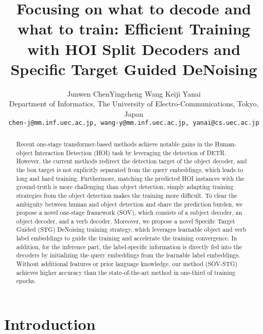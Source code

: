 \documentclass[10pt,twocolumn,letterpaper]{article}
\begin{document}
\title{Focusing on what to decode and what to train: Efficient Training with HOI Split Decoders and Specific Target Guided DeNoising}

\author{Junwen Chen\qquad Yingcheng Wang \qquad Keiji Yanai\\
Department of Informatics, The University of Electro-Communications, Tokyo, Japan\\
{\tt\small chen-j@mm.inf.uec.ac.jp, wang-y@mm.inf.uec.ac.jp, yanai@cs.uec.ac.jp}
}
\maketitle

\begin{abstract}
    Recent one-stage transformer-based methods achieve notable gains in the Human-object Interaction Detection (HOI) task by leveraging the detection of DETR.
    However, the current methods redirect the detection target of the object decoder, and the box target is not explicitly separated from the query embeddings, which leads to long and hard training.
    Furthermore, matching the predicted HOI instances with the ground-truth is more challenging than object detection, simply adapting training strategies from the object detection makes the training more difficult.
    To clear the ambiguity between human and object detection and share the prediction burden, we propose a novel one-stage framework (SOV), which consists of a subject decoder, an object decoder, and a verb decoder.
    Moreover, we propose a novel Specific Target Guided (STG) DeNoising training strategy, which leverages learnable object and verb label embeddings to guide the training and accelerate the training convergence.
    In addition, for the inference part, the label-specific information is directly fed into the decoders by initializing the query embeddings from the learnable label embeddings.
    Without additional features or prior language knowledge, our method (SOV-STG) achieves higher accuracy than the state-of-the-art method in one-third of training epochs.
\end{abstract}

\section{Introduction}
\label{sec:intro}
\end{document}
